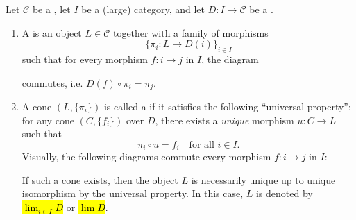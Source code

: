\begin{definition} \label{definition:limit_and_colimit_of_a_diagram_in_a_category}
Let $\mathcal{C}$ be a , let $I$ be a (large) category, and let $D: I \to \mathcal{C}$ be a .

\begin{enumerate}
    \item A  is an object $L \in \mathcal{C}$ together with a family of morphisms
    \[
    \{\pi_i: L \to D(i)\}_{i \in I}
    \]
    such that for every morphism $f: i \to j$ in $I$, the diagram
    \begin{center}
    \end{center}
    commutes, i.e.  $D(f) \circ \pi_i = \pi_j$.
    


    \item A cone $(L, \{\pi_i\})$ is called a  if it satisfies the following ``universal property'':
    for any cone $(C, \{ f_i \})$ over $D$, there exists a \textit{unique} morphism $u: C \to L$ such that
    \[
    \pi_i \circ u = f_i \quad \text{for all } i \in I.
    \]
    Visually, the following diagrams commute every morphism $f: i \to j$ in $I$:
    \begin{center}
    \end{center}
    If such a cone exists, then the object $L$ is necessarily unique up to unique isomorphism by the universal property. In this case, $L$ is denoted by \hl{$\lim_{i \in I} D$} or \hl{$\lim D$}.




\end{enumerate}
\end{definition}

